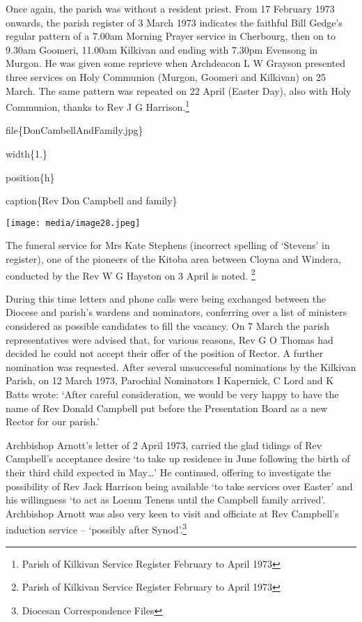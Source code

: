 Once again, the parish was without a resident priest. From 17 February
1973 onwards, the parish register of 3 March 1973 indicates the faithful
Bill Gedge's regular pattern of a 7.00am Morning Prayer service in
Cherbourg, then on to 9.30am Goomeri, 11.00am Kilkivan and ending with
7.30pm Evensong in Murgon. He was given some reprieve when Archdeacon L
W Grayson presented three services on Holy Communion (Murgon, Goomeri
and Kilkivan) on 25 March. The same pattern was repeated on 22 April
(Easter Day), also with Holy Communion, thanks to Rev J G
Harrison.\footnote{Parish of Kilkivan Service Register February to April
  1973}

file\{DonCambellAndFamily.jpg\}

width\{1.\}

position\{h\}

caption\{Rev Don Campbell and family\}

\texttt{[image: media/image28.jpeg]}

The funeral service for Mrs Kate Stephens (incorrect spelling of
`Stevens' in register), one of the pioneers of the Kitoba area between
Cloyna and Windera, conducted by the Rev W G Hayston on 3 April is
noted. \footnote{Parish of Kilkivan Service Register February to April
  1973}

During this time letters and phone calls were being exchanged between
the Diocese and parish's wardens and nominators, conferring over a list
of ministers considered as possible candidates to fill the vacancy. On 7
March the parish representatives were advised that, for various reasons,
Rev G O Thomas had decided he could not accept their offer of the
position of Rector. A further nomination was requested. After several
unsuccessful nominations by the Kilkivan Parish, on 12 March 1973,
Parochial Nominators I Kapernick, C Lord and K Batts wrote: `After
careful consideration, we would be very happy to have the name of Rev
Donald Campbell put before the Presentation Board as a new Rector for
our parish.'

Archbishop Arnott's letter of 2 April 1973, carried the glad tidings of
Rev Campbell's acceptance desire `to take up residence in June following
the birth of their third child expected in May\ldots' He continued,
offering to investigate the possibility of Rev Jack Harrison being
available `to take services over Easter' and his willingness `to act as
Locum Tenens until the Campbell family arrived'. Archbishop Arnott was
also very keen to visit and officiate at Rev Campbell's induction
service -- `possibly after Synod'.\footnote{Diocesan Correspondence
  Files}

